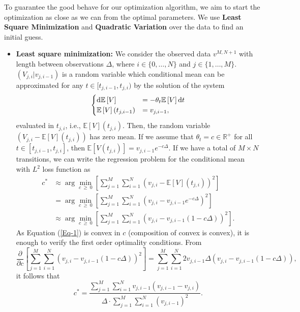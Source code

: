 \documentclass[11pt]{article}
\theoremstyle{definition}
\newcommand{\E}{\mathbb{E}}
\newcommand{\R}{\mathbb{R}}
\begin{document}
To guarantee the good behave for our optimization algorithm, we aim to start the optimization as close as we can from the optimal parameters. We use \textbf{Least Square Minimization} and \textbf{Quadratic Variation} over the data to find an initial guess.

\begin{itemize}

\item \textbf{Least square minimization:} We consider the observed data $v^{M,N+1}$ with length between observations $\Delta$, where $i\in\{0,\dots,N\}$ and $j\in\{1,\dots,M\}$. $(V_{j,i}|v_{j,i-1})$ is a random variable which conditional mean can be approximated for any $t\in [t_{j,i-1}, t_{j, i})$ by the solution of the system
\begin{equation*}
\begin{cases}
\dif \E\left[V\right]&=-\theta_t\E\left[V\right]\dif t\\
\E\left[V\right](t_{j,i-1})&=v_{j,i-1},
\end{cases}
\end{equation*}
evaluated in $t_{j,i}$, i.e., $\E\left[V\right](t_{j,i})$. Then, the random variable $(V_{j,i}-\E\left[V\right](t_{j,i}))$ has zero mean. If we assume that $\theta_t=c\in\R^+$ for all $t\in[t_{j,i-1},t_{j,i}]$, then $\E\left[V(t_{j,i})\right]=v_{j,i-1}e^{-c\Delta}$. If we have a total of $M\times N$ transitions, we can write the regression problem for the conditional mean with $L^2$ loss function as
\begin{equation}
\begin{split}
c^*&\approx\arg\min_{c\ \geq\ 0}\left[\sum_{j=1}^M\sum_{i=1}^{N}\left(v_{j,i}-\E\left[V\right](t_{j,i})\right)^2\right]\\
&=\arg\min_{c\ \geq\ 0}\left[\sum_{j=1}^M\sum_{i=1}^{N}\left(v_{j,i}-v_{j,i-1}e^{-c\Delta}\right)^2\right]\\
&\approx\arg\min_{c\ \geq\ 0}\left[\sum_{j=1}^M\sum_{i=1}^{N}\left(v_{j,i}-v_{j,i-1}(1-c\Delta)\right)^2\right].
\end{split}
\label{Eq-1}
\end{equation}
As Equation (\ref{Eq-1}) is convex in $c$ (composition of convex is convex), it is enough to verify the first order optimality conditions. From
\begin{equation*}
\frac{\partial}{\partial c}\left[\sum_{j=1}^M\sum_{i=1}^{N}\left(v_{j,i}-v_{j,i-1}(1-c\Delta)\right)^2\right]=\sum_{j=1}^M\sum_{i=1}^{N}2v_{j,i-1}\Delta\left(v_{j,i}-v_{j,i-1}(1-c\Delta)\right),
\end{equation*}
it follows that
\begin{equation}
c^{*}=\frac{\sum_{j=1}^M\sum_{i=1}^{N}v_{j,i-1}(v_{j,i-1}-v_{j,i})}{\Delta\cdot\sum_{j=1}^M\sum_{i=1}^{N}(v_{j,i-1})^2}.
\label{Eq-4}
\end{equation}


\end{itemize}
\end{document}
